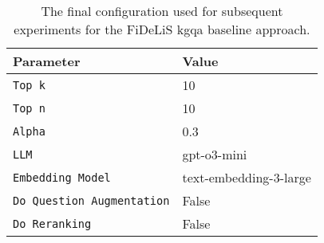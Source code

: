 \begin{table}[t]
    \centering
    \begin{tabular}{l l}   
        \toprule
        \textbf{Parameter} & \textbf{Value} \\
        \midrule
        \texttt{Top k} & 10 \\
        \texttt{Top n} & 10 \\
        \texttt{Alpha} & 0.3 \\
        \texttt{LLM} & gpt-o3-mini \\
        \texttt{Embedding Model} & text-embedding-3-large \\ 
        \texttt{Do Question Augmentation} & False \\
        \texttt{Do Reranking} & False \\
        \bottomrule
    \end{tabular}
    \caption[Final Configuration of FiDeLis]{The final configuration used for subsequent experiments for the FiDeLiS \gls{kgqa} baseline approach.}
    \label{tab:fidelis_final_config}
\end{table}